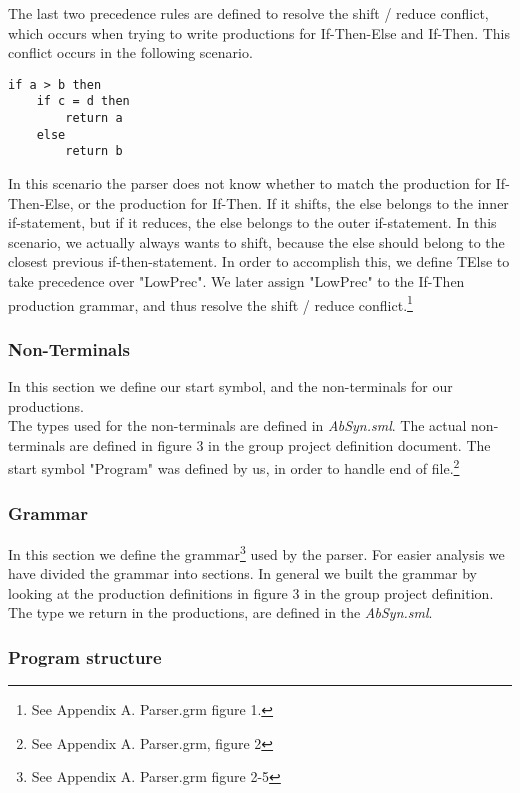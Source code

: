 \documentclass[12pt,a4paper,english]{article}
\begin{document}
The last two precedence rules are defined to resolve the shift / reduce conflict, which occurs when trying to write productions for If-Then-Else and If-Then. This conflict occurs in the following scenario. 
\begin{lstlisting}
if a > b then
    if c = d then
        return a
    else
        return b
\end{lstlisting}
In this scenario the parser does not know whether to match the production for If-Then-Else, or the production for If-Then. If it shifts, the else belongs to the inner if-statement, but if it reduces, the else belongs to the outer if-statement. In this scenario, we actually always wants to shift, because the else should belong to the closest previous if-then-statement. In order to accomplish this, we define TElse to take precedence over "LowPrec". We later assign "LowPrec" to the If-Then production grammar, and thus resolve the shift / reduce conflict.\footnote{See Appendix A. Parser.grm figure 1.}

\subsubsection{Non-Terminals}

In this section we define our start symbol, and the non-terminals for our productions. \\
The types used for the non-terminals are defined in \textit{AbSyn.sml}. The actual non-terminals are defined in figure 3 in the group project definition document. The start symbol "Program" was defined by us, in order to handle end of file.\footnote{See Appendix A. Parser.grm, figure 2}

\subsubsection{Grammar}

In this section we define the grammar\footnote{See Appendix A. Parser.grm figure 2-5} used by the parser. For easier analysis we have divided the grammar into sections.
In general we built the grammar by looking at the production definitions in figure 3 in the group project definition. The type we return in the productions, are defined in the \textit{AbSyn.sml}. 

\subsubsection{Program structure}
\end{document}
